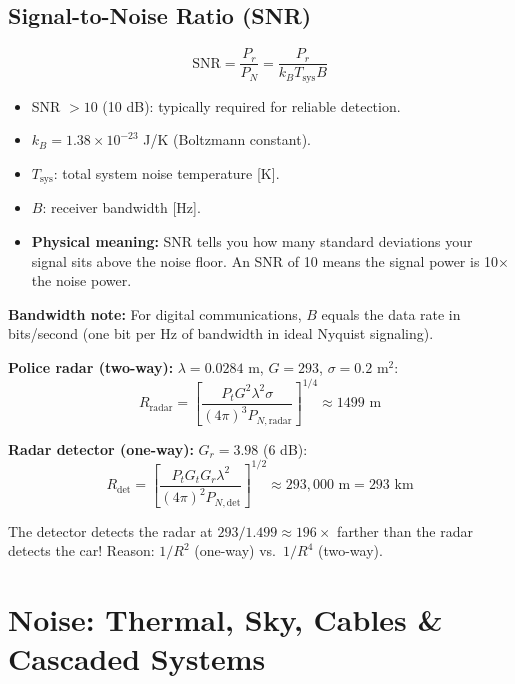 \documentclass[10pt,letterpaper]{article}
\begin{document}
\subsection{Signal-to-Noise Ratio (SNR)}

\begin{tcolorbox}[formulabox, title={SNR Definition \& Meaning}]
\begin{equation}
  \mathrm{SNR} = \frac{P_r}{P_N} = \frac{P_r}{k_B T_\mathrm{sys} B}
\end{equation}
\begin{itemize}[noitemsep]
  \item SNR $> 10$ (10 dB): typically required for reliable detection.
  \item $k_B = 1.38\times10^{-23}$ J/K (Boltzmann constant).
  \item $T_\mathrm{sys}$: total system noise temperature [K].
  \item $B$: receiver bandwidth [Hz].
  \item \textbf{Physical meaning:} SNR tells you how many standard deviations your signal sits above the noise floor. An SNR of 10 means the signal power is 10$\times$ the noise power.
\end{itemize}

\textbf{Bandwidth note:} For digital communications, $B$ equals the data rate in bits/second (one bit per Hz of bandwidth in ideal Nyquist signaling).
\end{tcolorbox}

\begin{tcolorbox}[examplebox, title={Police Radar vs.\ Detector (HW5 P3): 1/R$^2$ vs.\ 1/R$^4$}]
\textbf{Police radar (two-way):} $\lambda = 0.0284$ m, $G = 293$, $\sigma = 0.2$ m$^2$:
\[R_\mathrm{radar} = \left[\frac{P_t G^2\lambda^2\sigma}{(4\pi)^3 P_{N,\mathrm{radar}}}\right]^{1/4} \approx 1499 \text{ m}\]

\textbf{Radar detector (one-way):} $G_r = 3.98$ (6 dB):
\[R_\mathrm{det} = \left[\frac{P_t G_t G_r\lambda^2}{(4\pi)^2 P_{N,\mathrm{det}}}\right]^{1/2} \approx 293{,}000 \text{ m} = 293 \text{ km}\]

The detector detects the radar at $293/1.499 \approx 196\times$ farther than the radar detects the car! Reason: $1/R^2$ (one-way) vs.\ $1/R^4$ (two-way).
\end{tcolorbox}

\section{Noise: Thermal, Sky, Cables \& Cascaded Systems}
\end{document}
